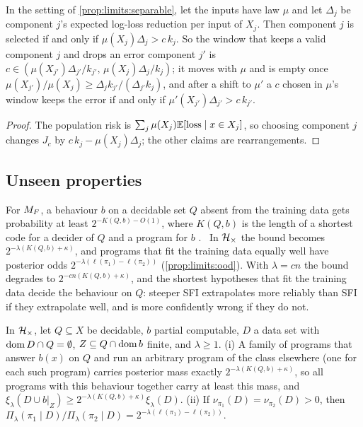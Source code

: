 \begin{proposition}\label{prop:limits:inputlaw}
In the setting of \cref{prop:limits:separable}, let the inputs have law $\mu$ and let $\Delta_j$ be component $j$'s expected log-loss reduction per input of $X_j$. Then component $j$ is selected if and only if $\mu(X_j)\Delta_j>c\,k_j$. So the window that keeps a valid component $j$ and drops an error component $j'$ is $c\in(\mu(X_{j'})\Delta_{j'}/k_{j'},\,\mu(X_j)\Delta_j/k_j)$; it moves with $\mu$ and is empty once $\mu(X_{j'})/\mu(X_j)\ge\Delta_jk_{j'}/(\Delta_{j'}k_j)$, and after a shift to $\mu'$ a $c$ chosen in $\mu$'s window keeps the error if and only if $\mu'(X_{j'})\Delta_{j'}>c\,k_{j'}$.
\end{proposition}

\begin{proof}
The population risk is $\sum_j\mu(X_j)\mathbb{E}[\text{loss}\mid x\in X_j]$, so choosing component $j$ changes $J_c$ by $c\,k_j-\mu(X_j)\Delta_j$; the other claims are rearrangements.
\end{proof}

\subsection{Unseen properties}\label{app:limits:ood}\label{sec:limits:ood}

For $M_{F}$, a behaviour $b$ on a decidable set $Q$ absent from the training data gets probability at least $2^{-K(Q,b)-O(1)}$, where $K(Q,b)$ is the length of a shortest code for a decider of $Q$ and a program for $b$ \citep[Proposition~8.1]{claudeSFI2026fundamentals}.%
\ In $\mathcal{H}_{\times}$ the bound becomes $2^{-\lambda(K(Q,b)+\kappa)}$, and programs that fit the training data equally well have posterior odds $2^{-\lambda(\ell(\pi_1)-\ell(\pi_2))}$ (\cref{prop:limits:ood}). With $\lambda=cn$ the bound degrades to $2^{-cn(K(Q,b)+\kappa)}$, and the shortest hypotheses that fit the training data decide the behaviour on $Q$: steeper SFI extrapolates more reliably than SFI if they extrapolate well, and is more confidently wrong if they do not.

\begin{proposition}\label{prop:limits:ood}
In $\mathcal{H}_{\times}$, let $Q\subseteq X$ be decidable, $b$ partial computable, $D$ a data set with $\operatorname{dom} D\cap Q=\emptyset$, $Z\subseteq Q\cap\operatorname{dom} b$ finite, and $\lambda\ge1$. (i) A family of programs that answer $b(x)$ on $Q$ and run an arbitrary program of the class elsewhere (one for each such program) carries posterior mass exactly $2^{-\lambda(K(Q,b)+\kappa)}$, so all programs with this behaviour together carry at least this mass, and $\xi_\lambda(D\cup b|_Z)\ge2^{-\lambda(K(Q,b)+\kappa)}\xi_\lambda(D)$. (ii) If $\nu_{\pi_1}(D)=\nu_{\pi_2}(D)>0$, then $\Pi_\lambda(\pi_1\mid D)/\Pi_\lambda(\pi_2\mid D)=2^{-\lambda(\ell(\pi_1)-\ell(\pi_2))}$.
\end{proposition}

